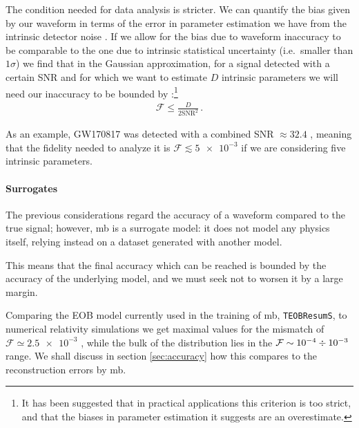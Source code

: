 \documentclass[main.tex]{subfiles}
\begin{document}
The condition needed for data analysis is stricter.
We can quantify the bias given by our waveform in terms of the error in parameter estimation we have from the intrinsic detector noise \cites[sec.\ A]{lindblomModelWaveformAccuracy2008}[sec.\ C]{damourAccuracyEffectualnessClosedform2011}. 
If we allow for the bias due to waveform inaccuracy to be comparable to the one due to intrinsic statistical uncertainty (i.e.\ smaller than \(1 \sigma \)) we find that in the Gaussian approximation, for a signal detected with a certain \ac{SNR} and for which we want to estimate \(D\) intrinsic parameters we will need our inaccuracy to be bounded by
\cites[appendix G]{chatziioannouConstructingGravitationalWaves2017}{gambaWaveformSystematicsGravitationalwave2021}:\footnote{It has been suggested \cite[sec.\ III]{purrerGravitationalWaveformAccuracy2020} that in practical applications this criterion is too strict, and that the biases in parameter estimation it suggests are an overestimate.}
%
\begin{align}
\mathcal{F} \leq \frac{D}{2 \text{SNR}^2}
\,.
\end{align}

As an example, GW170817 was detected with a combined SNR \(\approx 32.4\) \cite[]{abbottGW170817ObservationGravitational2017}, meaning that the fidelity needed to analyze it is \(\mathcal{F} \lesssim \num{5e-3}\) if we are considering five intrinsic parameters.

\paragraph{Surrogates}

The previous considerations regard the accuracy of a waveform compared to the true signal; however, \ac{mb} is a surrogate model: it does not model any physics itself, relying instead on a dataset generated with another model. 

This means that the final accuracy which can be reached is bounded by the accuracy of the underlying model, and we must seek not to worsen it by a large margin.

Comparing the \ac{EOB} model currently used in the training of \ac{mb}, \texttt{TEOBResumS}, to numerical relativity simulations we get maximal values for the mismatch of \(\mathcal{F} \simeq \num{2.5e-3}\) \cite[fig.\ 1]{nagarTimedomainEffectiveonebodyGravitational2018}, while the bulk of the distribution lies in the \(\mathcal{F} \sim \num{e-4} \divisionsymbol \num{e-3}\) range.
We shall discuss in section \ref{sec:accuracy} how this compares to the reconstruction errors by \ac{mb}.
\end{document}
